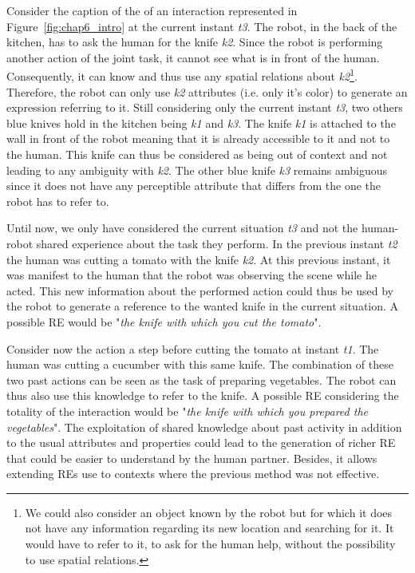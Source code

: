 Consider the caption of the of an interaction represented in Figure~\ref{fig:chap6_intro} at the current instant \textit{t3}. The robot, in the back of the kitchen, has to ask the human for the knife \textit{k2}. Since the robot is performing another action of the joint task, it cannot see what is in front of the human. Consequently, it can know and thus use any spatial relations about \textit{k2}\footnote{We could also consider an object known by the robot but for which it does not have any information regarding its new location and searching for it. It would have to refer to it, to ask for the human help, without the possibility to use spatial relations.}. Therefore, the robot can only use \textit{k2} attributes (i.e. only it's color) to generate an expression referring to it. Still considering only the current instant \textit{t3}, two others blue knives hold in the kitchen being \textit{k1} and \textit{k3}. The knife \textit{k1} is attached to the wall in front of the robot meaning that it is already accessible to it and not to the human. This knife can thus be considered as being out of context and not leading to any ambiguity with \textit{k2}. The other blue knife \textit{k3} remains ambiguous since it does not have any perceptible attribute that differs from the one the robot has to refer to.

Until now, we only have considered the current situation \textit{t3} and not the human-robot shared experience about the task they perform. In the previous instant \textit{t2} the human was cutting a tomato with the knife \textit{k2}. At this previous instant, it was manifest to the human that the robot was observing the scene while he acted. This new information about the performed action could thus be used by the robot to generate a reference to the wanted knife in the current situation. A possible RE would be "\textit{the knife with which you cut the tomato}". 

Consider now the action a step before cutting the tomato at instant \textit{t1}. The human was cutting a cucumber with this same knife. The combination of these two past actions can be seen as the task of preparing vegetables. The robot can thus also use this knowledge to refer to the knife. A possible RE considering the totality of the interaction would be "\textit{the knife with which you prepared the vegetables}". The exploitation of shared knowledge about past activity in addition to the usual attributes and properties could lead to the generation of richer RE that could be easier to understand by the human partner. Besides, it allows extending REs use to contexts where the previous method was not effective.

